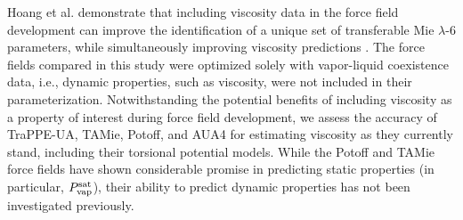 \documentclass[preprint,review,12pt]{elsarticle}
\begin{document}
	
	
%	
    
        
        
	Hoang et al. demonstrate that including viscosity data in the force field development can improve the identification of a unique set of transferable Mie $\lambda$-6 parameters, while simultaneously improving viscosity predictions \cite{Hoang2017}. The force fields compared in this study were optimized solely with vapor-liquid coexistence data, i.e., dynamic properties, such as viscosity, were not included in their parameterization. Notwithstanding the potential benefits of including viscosity as a property of interest during force field development, we assess the accuracy of TraPPE-UA, TAMie, Potoff, and AUA4 for estimating viscosity as they currently stand, including their torsional potential models. While the Potoff and TAMie force fields have shown considerable promise in predicting static properties (in particular, $P_{\rm vap}^{\rm sat}$), their ability to predict dynamic properties has not been investigated previously. 
        
\end{document}
